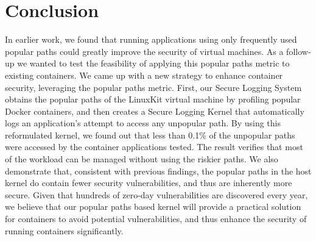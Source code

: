 \section{Conclusion}
\label{sec.conclusion}
In earlier work, we found that running applications using only frequently used popular paths could greatly improve the security of virtual machines. 
As a follow-up we wanted to test the feasibility of applying this popular paths metric to existing containers. 
We came up with a new strategy to enhance container security, leveraging the popular paths metric. 
First, our Secure Logging System obtains the popular paths of the LinuxKit virtual machine by profiling popular Docker containers, 
and then creates a Secure Logging Kernel that automatically logs an application’s attempt to access any unpopular path. 
By using this  reformulated kernel, we found out that less than 0.1\% of the unpopular paths were accessed by the container applications tested. 
The result verifies that most of the workload can be managed without using the riskier paths. 
We also demonstrate that, consistent with previous findings, the popular paths in the host kernel do contain fewer security vulnerabilities, and thus are inherently more secure. 
Given that hundreds of zero-day vulnerabilities are discovered every year, we believe that our popular paths based kernel will provide a practical solution for containers to avoid potential vulnerabilities, 
and thus enhance the security of running containers significantly. 
